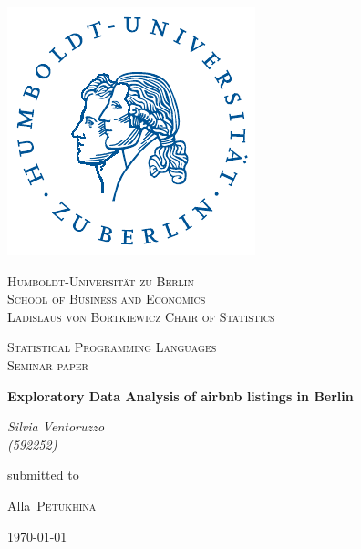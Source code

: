   \begin{center}
  
  \includegraphics[scale=1]{hulogo.pdf} \par\vspace{1cm}
  {\scshape\LARGE Humboldt-Universität zu Berlin} \\
  {\scshape\Large School of Business and Economics \\
  Ladislaus von Bortkiewicz Chair of Statistics}
  \par
  \vspace{1cm}
  {\scshape\large Statistical Programming Languages \\
  \Large Seminar paper} \par
  \vspace{1.5cm}
  {\huge\bfseries Exploratory Data Analysis of airbnb listings in Berlin\par}
  \vspace{1cm}
  {\Large\itshape Silvia Ventoruzzo \\
    (592252)} \par
  \vspace{1cm}
  \vfill
  submitted to \par
  {\Large Alla~\scshape Petukhina \par}
  \vfill
  {\large \today\par}
\end{center}
